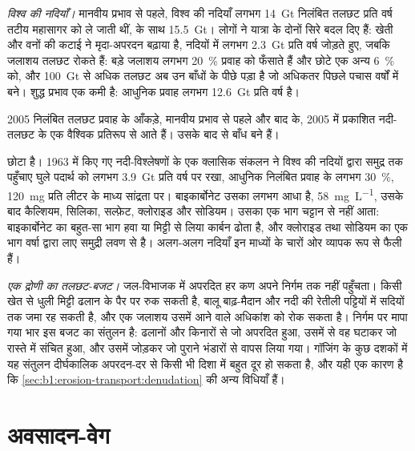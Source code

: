 \emph{विश्व की नदियाँ।} मानवीय प्रभाव से पहले, विश्व की नदियाँ लगभग \qty{14}{Gt} निलंबित तलछट प्रति वर्ष तटीय महासागर को ले जाती थीं,  के साथ \qty{15.5}{Gt}। लोगों ने यात्रा के दोनों सिरे बदल दिए हैं: खेती और वनों की कटाई ने मृदा-अपरदन बढ़ाया है, नदियों में लगभग \qty{2.3}{Gt} प्रति वर्ष जोड़ते हुए, जबकि जलाशय तलछट रोकते हैं: बड़े जलाशय लगभग \qty{20}{\percent} प्रवाह को फँसाते हैं और छोटे एक अन्य \qty{6}{\percent} को, और \qty{100}{Gt} से अधिक तलछट अब उन बाँधों के पीछे पड़ा है जो अधिकतर पिछले पचास वर्षों में बने। शुद्ध प्रभाव एक कमी है: आधुनिक प्रवाह लगभग \qty{12.6}{Gt} प्रति वर्ष है।

\begin{dated}{2005}
निलंबित तलछट प्रवाह के आँकड़े, मानवीय प्रभाव से पहले और बाद के, 2005 में प्रकाशित नदी-तलछट के एक वैश्विक प्रतिरूप से आते हैं। उसके बाद से बाँध बने हैं।
\end{dated}

 छोटा है। 1963 में किए गए नदी-विश्लेषणों के एक क्लासिक संकलन ने विश्व की नदियों द्वारा समुद्र तक पहुँचाए घुले पदार्थ को लगभग \qty{3.9}{Gt} प्रति वर्ष पर रखा, आधुनिक निलंबित प्रवाह के लगभग \qty{30}{\percent}, \qty{120}{mg} प्रति लीटर के माध्य सांद्रता पर। बाइकार्बोनेट उसका लगभग आधा है, \qty{58}{mg.L^{-1}}, उसके बाद कैल्शियम, सिलिका, सल्फ़ेट, क्लोराइड और सोडियम। उसका एक भाग चट्टान से नहीं आता: बाइकार्बोनेट का बहुत-सा भाग हवा या मिट्टी से लिया कार्बन ढोता है, और क्लोराइड तथा सोडियम का एक भाग वर्षा द्वारा लाए समुद्री लवण से है। अलग-अलग नदियाँ इन माध्यों के चारों ओर व्यापक रूप से फैली हैं।

\emph{एक द्रोणी का तलछट-बजट।} जल-विभाजक में अपरदित हर कण अपने निर्गम तक नहीं पहुँचता। किसी खेत से धुली मिट्टी ढलान के पैर पर रुक सकती है, बालू बाढ़-मैदान और नदी की रेतीली पट्टियों में सदियों तक जमा रह सकती है, और एक जलाशय उसमें आने वाले अधिकांश को रोक सकता है। निर्गम पर मापा गया भार इस बजट का संतुलन है: ढलानों और किनारों से जो अपरदित हुआ, उसमें से वह घटाकर जो रास्ते में संचित हुआ, और उसमें जोड़कर जो पुराने भंडारों से वापस लिया गया। गॉजिंग के कुछ दशकों में यह संतुलन दीर्घकालिक अपरदन-दर से किसी भी दिशा में बहुत दूर हो सकता है, और यही एक कारण है कि \cref{sec:b1:erosion-transport:denudation} की अन्य विधियाँ हैं।

\section{अवसादन-वेग}\label{sec:b1:erosion-transport:settling}

